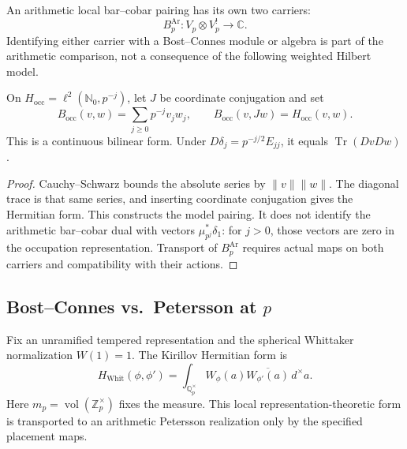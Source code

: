 An arithmetic local bar--cobar pairing has its own two carriers:
\begin{equation}
\label{v4-arith:kp:eq:Koszul-p}
 B_p^{\mathrm{Ar}}:V_p\otimes V_p^!\longrightarrow\mathbb C.
\end{equation}
Identifying either carrier with a Bost--Connes module or algebra is
part of the arithmetic comparison, not a consequence of the following
weighted Hilbert model.

\begin{proposition}
\label{v4-arith:kp:prop:Koszul-p-is-BC}
On \(H_{\mathrm{occ}}=\ell^2(\mathbb N_0,p^{-j})\), let \(J\)
be coordinate conjugation and set
\begin{equation}
\label{v4-arith:kp:eq:Koszul-p-is-BC}
 B_{\mathrm{occ}}(v,w)=\sum_{j\ge0}p^{-j}v_jw_j,
 \qquad B_{\mathrm{occ}}(v,Jw)=H_{\mathrm{occ}}(v,w).
\end{equation}
This is a continuous bilinear form. Under
\(D\delta_j=p^{-j/2}E_{jj}\), it equals \(\operatorname{Tr}(DvDw)\).
\end{proposition}
\begin{proof}
Cauchy--Schwarz bounds the absolute series by
\(\|v\|\|w\|\). The diagonal trace is that same series, and
inserting coordinate conjugation gives the Hermitian form.
This constructs the model pairing. It does not identify the
arithmetic bar--cobar dual with vectors \(\mu_{p^j}^*\delta_1\):
for \(j>0\), those vectors are zero in the occupation representation.
Transport of \(B_p^{\mathrm{Ar}}\) requires actual maps on both
carriers and compatibility with their actions.
\end{proof}

\subsection{Bost--Connes vs.~Petersson at \texorpdfstring{\(p\)}{p}}
\label{v4-arith:kp:finite:BC-vs-Pet}

Fix an unramified tempered representation and the spherical
Whittaker normalization \(W(1)=1\). The Kirillov Hermitian form is
\begin{equation}
\label{v4-arith:kp:eq:Pet-p-RS}
 H_{\mathrm{Whit}}(\phi,\phi')
 =\int_{\mathbb Q_p^\times}W_\phi(a)\overline{W_{\phi'}(a)}\,d^\times a.
\end{equation}
Here \(m_p=\operatorname{vol}(\mathbb Z_p^\times)\) fixes the measure.
This local representation-theoretic form is transported to an
arithmetic Petersson realization only by the specified placement maps.


